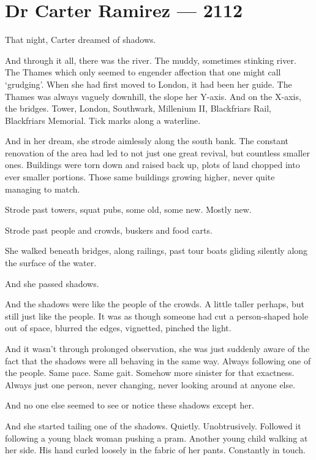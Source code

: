 \hypertarget{dr-carter-ramirez-2112}{%
\chapter*{Dr Carter Ramirez — 2112}\label{dr-carter-ramirez-2112}}

That night, Carter dreamed of shadows.

And through it all, there was the river. The muddy, sometimes stinking river. The Thames which only seemed to engender affection that one might call `grudging'. When she had first moved to London, it had been her guide. The Thames was always vaguely downhill, the slope her Y-axis. And on the X-axis, the bridges. Tower, London, Southwark, Millenium II, Blackfriars Rail, Blackfriars Memorial. Tick marks along a waterline.

And in her dream, she strode aimlessly along the south bank. The constant renovation of the area had led to not just one great revival, but countless smaller ones. Buildings were torn down and raised back up, plots of land chopped into ever smaller portions. Those same buildings growing higher, never quite managing to match.

Strode past towers, squat pubs, some old, some new. Mostly new.

Strode past people and crowds, buskers and food carts.

She walked beneath bridges, along railings, past tour boats gliding silently along the surface of the water.

And she passed shadows.

And the shadows were like the people of the crowds. A little taller perhaps, but still just like the people. It was as though someone had cut a person-shaped hole out of space, blurred the edges, vignetted, pinched the light.

And it wasn't through prolonged observation, she was just suddenly aware of the fact that the shadows were all behaving in the same way. Always following one of the people. Same pace. Same gait. Somehow more sinister for that exactness. Always just one person, never changing, never looking around at anyone else.

And no one else seemed to see or notice these shadows except her.

And she started tailing one of the shadows. Quietly. Unobtrusively. Followed it following a young black woman pushing a pram. Another young child walking at her side. His hand curled loosely in the fabric of her pants. Constantly in touch.

